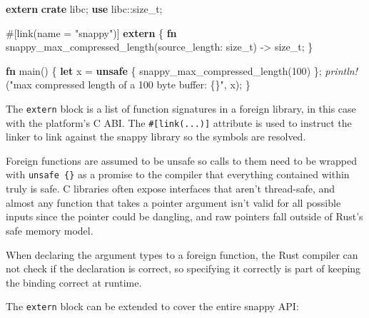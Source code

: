 \documentclass[a4paper,]{book}
\newenvironment{Shaded}{\begin{snugshade}}{\end{snugshade}}
\newcommand{\KeywordTok}[1]{\textcolor[rgb]{0.13,0.29,0.53}{\textbf{{#1}}}}
\newcommand{\DataTypeTok}[1]{\textcolor[rgb]{0.13,0.29,0.53}{{#1}}}
\newcommand{\DecValTok}[1]{\textcolor[rgb]{0.00,0.00,0.81}{{#1}}}
\newcommand{\StringTok}[1]{\textcolor[rgb]{0.31,0.60,0.02}{{#1}}}
\newcommand{\PreprocessorTok}[1]{\textcolor[rgb]{0.56,0.35,0.01}{\textit{{#1}}}}
\newcommand{\AttributeTok}[1]{\textcolor[rgb]{0.77,0.63,0.00}{{#1}}}
\newcommand{\NormalTok}[1]{{#1}}
\begin{document}
\begin{Shaded}
\begin{Highlighting}[]
\KeywordTok{extern} \KeywordTok{crate} \NormalTok{libc;}
\KeywordTok{use} \NormalTok{libc::}\DataTypeTok{size_t}\NormalTok{;}

\AttributeTok{#[}\NormalTok{link}\AttributeTok{(}\NormalTok{name }\AttributeTok{=} \StringTok{"snappy"}\AttributeTok{)]}
\KeywordTok{extern} \NormalTok{\{}
    \KeywordTok{fn} \NormalTok{snappy_max_compressed_length(source_length: }\DataTypeTok{size_t}\NormalTok{) -> }\DataTypeTok{size_t}\NormalTok{;}
\NormalTok{\}}

\KeywordTok{fn} \NormalTok{main() \{}
    \KeywordTok{let} \NormalTok{x = }\KeywordTok{unsafe} \NormalTok{\{ snappy_max_compressed_length(}\DecValTok{100}\NormalTok{) \};}
    \PreprocessorTok{println!}\NormalTok{(}\StringTok{"max compressed length of a 100 byte buffer: \{\}"}\NormalTok{, x);}
\NormalTok{\}}
\end{Highlighting}
\end{Shaded}

The \texttt{extern} block is a list of function signatures in a foreign
library, in this case with the platform's C ABI. The
\texttt{\#{[}link(...){]}} attribute is used to instruct the linker to
link against the snappy library so the symbols are resolved.

Foreign functions are assumed to be unsafe so calls to them need to be
wrapped with \texttt{unsafe\ \{\}} as a promise to the compiler that
everything contained within truly is safe. C libraries often expose
interfaces that aren't thread-safe, and almost any function that takes a
pointer argument isn't valid for all possible inputs since the pointer
could be dangling, and raw pointers fall outside of Rust's safe memory
model.

When declaring the argument types to a foreign function, the Rust
compiler can not check if the declaration is correct, so specifying it
correctly is part of keeping the binding correct at runtime.

The \texttt{extern} block can be extended to cover the entire snappy
API:
\end{document}
